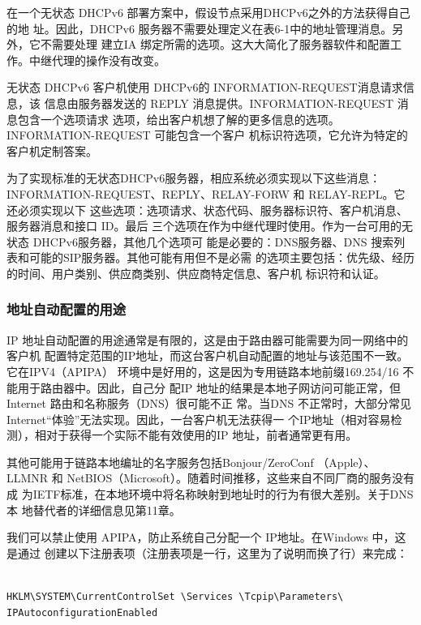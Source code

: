 在一个无状态 DHCPv6 部署方案中，假设节点采用DHCPv6之外的方法获得自己的地
址。因此，DHCPv6 服务器不需要处理定义在表6-1中的地址管理消息。另外，它不需要处理
建立IA 绑定所需的选项。这大大简化了服务器软件和配置工作。中继代理的操作没有改变。

无状态 DHCPv6 客户机使用 DHCPv6的 INFORMATION-REQUEST消息请求信息，该
信息由服务器发送的 REPLY 消息提供。INFORMATION-REQUEST 消息包含一个选项请求
选项，给出客户机想了解的更多信息的选项。INFORMATION-REQUEST 可能包含一个客户
机标识符选项，它允许为特定的客户机定制答案。

为了实现标准的无状态DHCPv6服务器，相应系统必须实现以下这些消息：
INFORMATION-REQUEST、REPLY、RELAY-FORW 和 RELAY-REPL。它还必须实现以下
这些选项：选项请求、状态代码、服务器标识符、客户机消息、服务器消息和接口 ID。最后
三个选项在作为中继代理时使用。作为一台可用的无状态 DHCPv6服务器，其他几个选项可
能是必要的：DNS服务器、DNS 搜索列表和可能的SIP服务器。其他可能有用但不是必需
的选项主要包括：优先级、经历的时间、用户类别、供应商类别、供应商特定信息、客户机
标识符和认证。

\subsubsection{地址自动配置的用途}
IP 地址自动配置的用途通常是有限的，这是由于路由器可能需要为同一网络中的客户机
配置特定范围的IP地址，而这台客户机自动配置的地址与该范围不一致。它在IPV4（APIPA）
环境中是好用的，这是因为专用链路本地前缀169.254/16 不能用于路由器中。因此，自己分
配IP 地址的结果是本地子网访问可能正常，但 Internet 路由和名称服务（DNS）很可能不正
常。当DNS 不正常时，大部分常见 Internet“体验”无法实现。因此，一台客户机无法获得一
个IP地址（相对容易检测），相对于获得一个实际不能有效使用的IP 地址，前者通常更有用。

\begin{tcolorbox}
    其他可能用于链路本地编址的名字服务包括Bonjour/ZeroConf （Apple）、
    LLMNR 和 NetBIOS（Microsoft）。随着时间推移，这些来自不同厂商的服务没有成
    为IETF标准，在本地环境中将名称映射到地址时的行为有很大差别。关于DNS本
    地替代者的详细信息见第11章。
\end{tcolorbox}

我们可以禁止使用 APIPA，防止系统自己分配一个 IP地址。在Windows 中，这是通过
创建以下注册表项（注册表项是一行，这里为了说明而换了行）来完成：

\begin{verbatim}
    
HKLM\SYSTEM\CurrentControlSet \Services \Tcpip\Parameters\
IPAutoconfigurationEnabled
\end{verbatim}

